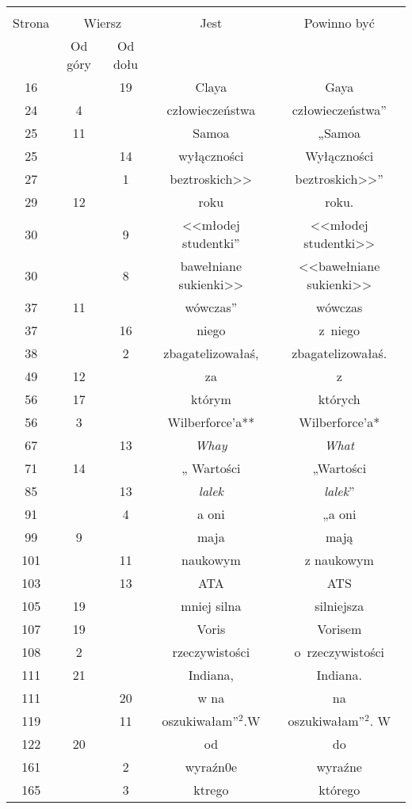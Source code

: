 \documentclass[a4paper,11pt]{article}
\begin{document}
\begin{center}

  \begin{tabular}{|c|c|c|c|c|}
    \hline
    & \multicolumn{2}{c|}{} & & \\
    Strona & \multicolumn{2}{c|}{Wiersz} & Jest
                              & Powinno być \\ \cline{2-3}
    & Od góry & Od dołu & & \\
    \hline
    16  & & 19 & Claya & Gaya \\
    24  &  4 & & człowieczeństwa & człowieczeństwa” \\
    25  & 11 & & Samoa & „Samoa \\
    25  & & 14 & wyłączności & Wyłączności \\
    27  & &  1 & beztroskich>> & beztroskich>>” \\
    29  & 12 & & roku & roku. \\
    30  & &  9 & <<młodej studentki” %
           & <<młodej studentki>> \\
    30  & &  8 & bawełniane sukienki>> & <<bawełniane sukienki>> \\
    37  & 11 & & wówczas” & wówczas \\
    37  & & 16 & niego & z~niego \\
    38  & &  2 & zbagatelizowałaś, & zbagatelizowałaś. \\
    49  & 12 & & za & z \\
    56  & 17 & & którym & których \\
    56  &  3 & & Wilberforce'a** & Wilberforce'a* \\
    67  & & 13 & \textit{Whay} & \textit{What} \\
    71  & 14 & & „ Wartości & „Wartości \\
    85  & & 13 & \textit{lalek} & \textit{lalek}” \\
    91  & &  4 & a oni & „a oni \\
    99  &  9 & & maja & mają \\
    101 & & 11 & naukowym & z naukowym \\
    103 & & 13 & ATA & ATS \\
    105 & 19 & & mniej silna & silniejsza \\
    107 & 19 & & Voris & Vorisem \\
    108 &  2 & & rzeczywistości & o~rzeczywistości \\
    111 & 21 & & Indiana, & Indiana. \\
    111 & & 20 & w na & na \\
    119 & & 11 & oszukiwałam”$^{ 2 }$.W & oszukiwałam”$^{ 2 }$. W \\
    122 & 20 & & od & do \\
    161 & &  2 & wyraźn0e & wyraźne \\
    165 & &  3 & ktrego & którego \\
    \hline
  \end{tabular}






\end{center}
\end{document}
